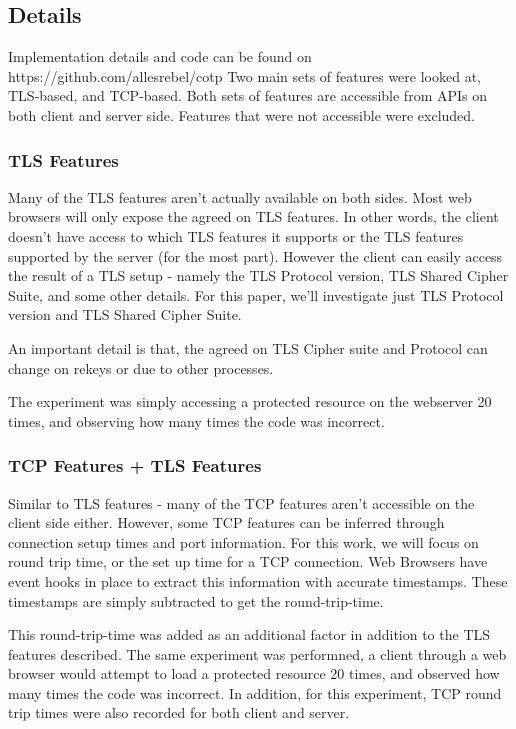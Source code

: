 \documentclass[a4paper, 11pt]{article} 				%
\begin{document}
\subsection{Details}
Implementation details and code can be found on https://github.com/allesrebel/cotp
Two main sets of features were looked at, TLS-based, and TCP-based. Both sets of features are accessible from APIs on both client and server side. Features that were not accessible were excluded. 

\subsubsection{TLS Features}
Many of the TLS features aren't actually available on both sides. Most web browsers will only expose the agreed on TLS features. In other words, the client doesn't have access to which TLS features it supports or the TLS features supported by the server (for the most part). However the client can easily access the result of a TLS setup - namely the TLS Protocol version, TLS Shared Cipher Suite, and some other details. For this paper, we'll investigate just TLS Protocol version and TLS Shared Cipher Suite. 

An important detail is that, the agreed on TLS Cipher suite and Protocol can change on rekeys or due to other processes. 

The experiment was simply accessing a protected resource on the webserver 20 times, and observing how many times the code was incorrect.

\subsubsection{TCP Features + TLS Features}
Similar to TLS features - many of the TCP features aren't accessible on the client side either. However, some TCP features can be inferred through connection setup times and port information. For this work, we will focus on round trip time, or the set up time for a TCP connection. Web Browsers have event hooks in place to extract this information with accurate timestamps. These timestamps are simply subtracted to get the round-trip-time. 

This round-trip-time was added as an additional factor in addition to the TLS features described. The same experiment was performned, a client through a web browser would attempt to load a protected resource 20 times, and observed how many times the code was incorrect. In addition, for this experiment, TCP round trip times were also recorded for both client and server.
\end{document}
